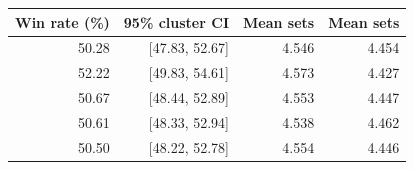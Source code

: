 \begin{tabular}{rrrr}
\toprule
Win rate (\%) & 95\% cluster CI & Mean sets \vsix{} & Mean sets \vfour{} \\
\midrule
50.28 & [47.83, 52.67] & 4.546 & 4.454 \\
52.22 & [49.83, 54.61] & 4.573 & 4.427 \\
50.67 & [48.44, 52.89] & 4.553 & 4.447 \\
50.61 & [48.33, 52.94] & 4.538 & 4.462 \\
50.50 & [48.22, 52.78] & 4.554 & 4.446 \\
\bottomrule
\end{tabular}
